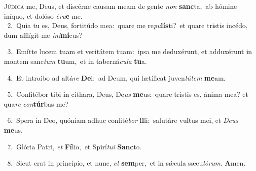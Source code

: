 \lettrine{\initial\textcolor{\initialcolor}{J}}{údica} me, Deus, et discérne causam meam de gente \textit{non} \textbf{sanc}\-ta,~\star ab hómine iníquo, et dolóso \textit{é}\-\textit{ru}\textbf{e} me.\\
{\numbfont\textcolor{\numbcolor}{~2.}}~Quia tu es, Deus, fortitúdo mea:~\dagger quare me re\-\textit{pu}\-\textbf{lís}ti?~\star et quare tristis incédo, dum afflígit me \textit{in}\-\textit{i}\textbf{mí}cus?\par
{\numbfont\textcolor{\numbcolor}{~3.}}~Emítte lucem tuam et veritátem tuam:~\dagger ipsa me deduxérunt, et adduxérunt in montem sanc\textit{tum} \textbf{tu}\-um,~\star et in taberná\-\textit{cu}\-\textit{la} \textbf{tu}\-a.\par
{\numbfont\textcolor{\numbcolor}{~4.}}~Et introíbo ad altá\textit{re} \textbf{De}\-i:~\star ad Deum, qui lætíficat juven\-\textit{tú}\-\textit{tem} \textbf{me}\-am.\par
{\numbfont\textcolor{\numbcolor}{~5.}}~Confitébor tibi in cíthara, Deus, De\textit{us} \textbf{me}\-us:~\star quare tristis es, ánima mea? et qua\textit{re} \textit{con}\-\textbf{túr}bas me?\par
{\numbfont\textcolor{\numbcolor}{~6.}}~Spera in Deo, quóniam adhuc confité\textit{bor} \textbf{il}\-li:~\star salutáre vultus mei, et \textit{De}\-\textit{us} \textbf{me}\-us.\par
{\numbfont\textcolor{\numbcolor}{~7.}}~Glória Patri, \textit{et} \textbf{Fí}\-lio,~\star et Spirí\-\textit{tu}\-\textit{i} \textbf{Sanc}\-to.\par
{\numbfont\textcolor{\numbcolor}{~8.}}~Sicut erat in princípio, et nunc, \textit{et} \textbf{sem}\-per,~\star et in sǽcula sæcu\-\textit{ló}\-\textit{rum}. \textbf{A}\-men.\par
